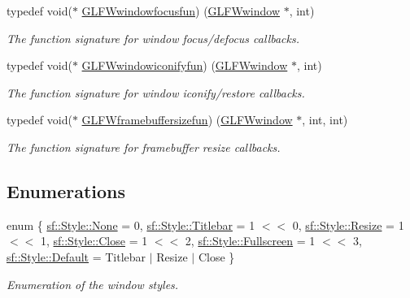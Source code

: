 \begin{DoxyCompactItemize}
typedef void($\ast$ \hyperlink{group__window_ga58be2061828dd35080bb438405d3a7e2}{G\+L\+F\+Wwindowfocusfun}) (\hyperlink{group__window_ga3c96d80d363e67d13a41b5d1821f3242}{G\+L\+F\+Wwindow} $\ast$, int)
\begin{DoxyCompactList}\small\item\em The function signature for window focus/defocus callbacks. \end{DoxyCompactList}\item 
typedef void($\ast$ \hyperlink{group__window_gad2d4e4c3d28b1242e742e8268b9528af}{G\+L\+F\+Wwindowiconifyfun}) (\hyperlink{group__window_ga3c96d80d363e67d13a41b5d1821f3242}{G\+L\+F\+Wwindow} $\ast$, int)
\begin{DoxyCompactList}\small\item\em The function signature for window iconify/restore callbacks. \end{DoxyCompactList}\item 
typedef void($\ast$ \hyperlink{group__window_ga3e218ef9ff826129c55a7d5f6971a285}{G\+L\+F\+Wframebuffersizefun}) (\hyperlink{group__window_ga3c96d80d363e67d13a41b5d1821f3242}{G\+L\+F\+Wwindow} $\ast$, int, int)
\begin{DoxyCompactList}\small\item\em The function signature for framebuffer resize callbacks. \end{DoxyCompactList}\end{DoxyCompactItemize}
\subsection*{Enumerations}
\begin{DoxyCompactItemize}
\item 
enum \{ \newline
\hyperlink{group__window_ggaf9d60653457de8820877e8edeb7a9839a8c35a9c8507559e455387fc4a83ce422}{sf\+::\+Style\+::\+None} = 0, 
\hyperlink{group__window_ggaf9d60653457de8820877e8edeb7a9839ab4c8b32b05ed715928513787cb1e85b6}{sf\+::\+Style\+::\+Titlebar} = 1 $<$$<$ 0, 
\hyperlink{group__window_ggaf9d60653457de8820877e8edeb7a9839accff967648ebcd5db2007eff7352b50f}{sf\+::\+Style\+::\+Resize} = 1 $<$$<$ 1, 
\hyperlink{group__window_ggaf9d60653457de8820877e8edeb7a9839ae07a7d411d5acf28f4a9a4b76a3a9493}{sf\+::\+Style\+::\+Close} = 1 $<$$<$ 2, 
\newline
\hyperlink{group__window_ggaf9d60653457de8820877e8edeb7a9839a6288ec86830245cf957e2d234f79f50d}{sf\+::\+Style\+::\+Fullscreen} = 1 $<$$<$ 3, 
\hyperlink{group__window_ggaf9d60653457de8820877e8edeb7a9839a5597cd420fc461807e4a201c92adea37}{sf\+::\+Style\+::\+Default} = Titlebar $\vert$ Resize $\vert$ Close
 \}\begin{DoxyCompactList}\small\item\em Enumeration of the window styles. \end{DoxyCompactList}
\end{DoxyCompactItemize}
